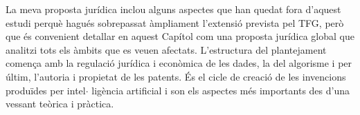 \documentclass[12pt]{article}
\begin{document}
\vspace{\baselineskip}
\begin{justify}
La meva proposta jurídica inclou alguns aspectes que han quedat fora d’aquest estudi perquè hagués sobrepassat àmpliament l’extensió prevista pel TFG, però que és convenient detallar en aquest Capítol com una proposta jurídica global que analitzi tots els àmbits que es veuen afectats. L’estructura del plantejament comença amb la regulació jurídica i econòmica de les dades, la del algorisme i per últim, l’autoria i propietat de les patents. És el cicle de creació de les invencions produïdes per intel$ \cdot $ ligència artificial i son els aspectes més importants des d’una vessant teòrica i pràctica. 
\end{justify}\par
\end{document}
